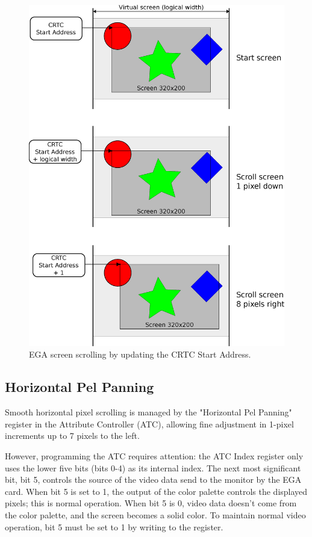 \documentclass[book.tex]{subfiles}
\begin{document}
\begin{figure}[H]
\centering
\includegraphics[width=1.0\textwidth]{imgs/drawings/virtual_screen.eps}
\caption{EGA screen scrolling by updating the CRTC Start Address.} 
\label{fig:tile_refresh}
\end{figure}



\subsection{Horizontal Pel Panning}
Smooth horizontal pixel scrolling is managed by the "Horizontal Pel Panning" register in the Attribute Controller (ATC), allowing fine adjustment in 1-pixel increments up to 7 pixels to the left. \\

\par
However, programming the ATC requires attention: the ATC Index register only uses the lower five bits (bits 0-4) as its internal index. The next most significant bit, bit 5, controls the source of the video data send to the monitor by the EGA card. When bit 5 is set to 1, the output of the color palette controls the displayed pixels; this is normal operation. When bit 5 is 0, video data doesn't come from the color palette, and the screen becomes a solid color. To maintain normal video operation, bit 5 must be set to 1 by writing  to the register.\\
\end{document}
